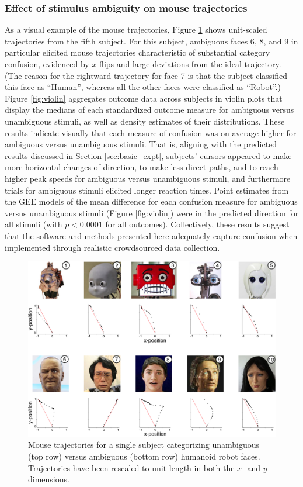 \documentclass[]{article}
\begin{document}
\subsubsection{Effect of stimulus ambiguity on mouse trajectories} 
\label{sec:valid_results}

As a visual example of the mouse trajectories, Figure \ref{fig:traj}
shows unit-scaled trajectories from the fifth subject. For this subject,
ambiguous faces 6, 8, and 9 in particular elicited mouse trajectories
characteristic of substantial category confusion, evidenced by
\(x\)-flips and large deviations from the ideal trajectory. (The reason
for the rightward trajectory for face 7 is that the subject classified
this face as ``Human'', whereas all the other faces were classified as
``Robot''.) Figure \ref{fig:violin} aggregates outcome data across
subjects in violin plots that display the medians of each standardized
outcome measure for ambiguous versus unambiguous stimuli, as well as
density estimates of their distributions. These results indicate
visually that each measure of confusion was on average higher for
ambiguous versus unambiguous stimuli. That is, aligning with the
predicted results discussed in Section \ref{sec:basic_expt}, subjects'
cursors appeared to make more horizontal changes of direction, to make
less direct paths, and to reach higher peak speeds for ambiguous versus
unambiguous stimuli, and furthermore trials for ambiguous stimuli
elicited longer reaction times. Point estimates from the GEE models of
the mean difference for each confusion measure for ambiguous versus
unambiguous stimuli (Figure \ref{fig:violin}) were in the predicted
direction for all stimuli (with \(p < 0.0001\) for all outcomes).
Collectively, these results suggest that the software and methods
presented here adequately capture confusion when implemented through
realistic crowdsourced data collection.

\begin{figure}[H]
\centering
\includegraphics[width=150mm]{figures/Figure 2.jpeg}
\caption{\label{fig:traj}Mouse trajectories for a single subject categorizing unambiguous (top row) versus ambiguous (bottom row) humanoid robot faces. Trajectories have been rescaled to unit length in both the $x$- and $y$-dimensions.}
\end{figure}
\end{document}
